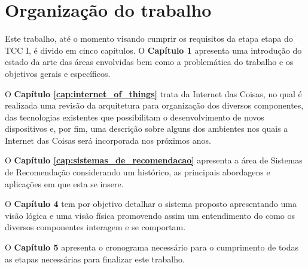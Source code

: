 
\section{Organização do trabalho} %

Este trabalho, até o momento visando cumprir os requisitos da etapa etapa do TCC I, é divido em cinco capítulos. O \textbf{Capítulo 1} apresenta uma introdução do estado da arte das áreas envolvidas bem como a problemática do trabalho e os objetivos gerais e específicos.

O \textbf{Capítulo \ref{cap:internet_of_things}} trata da Internet das Coisas, no qual é realizada uma revisão da arquitetura para organização dos diversos componentes, das tecnologias existentes que possibilitam o desenvolvimento de novos dispositivos e, por fim, uma descrição sobre alguns dos ambientes nos quais a Internet das Coisas será incorporada nos próximos anos.

O \textbf{Capítulo \ref{cap:sistemas_de_recomendacao}} apresenta a área de Sistemas de Recomendação considerando um histórico, as principais abordagens e aplicações em que esta se insere.  

O \textbf{Capítulo 4} tem por objetivo detalhar o sistema proposto apresentando uma visão lógica e uma visão física promovendo assim um entendimento do como os diversos componentes interagem e se comportam.

O \textbf{Capítulo 5} apresenta  o cronograma necessário para o cumprimento de todas as etapas necessárias para finalizar este trabalho.

	

